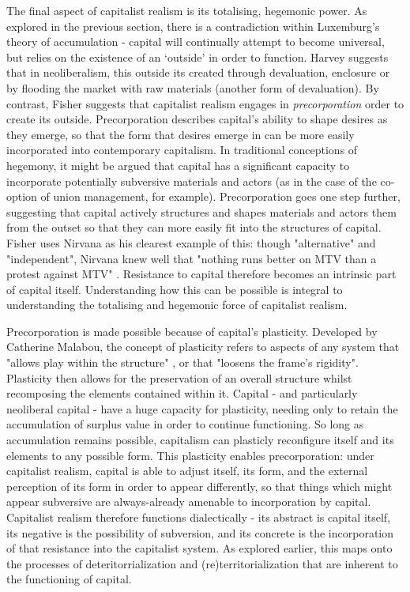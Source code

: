 The final aspect of capitalist realism is its totalising, hegemonic power. As explored in the previous section,  there is a contradiction within Luxemburg's theory of accumulation - capital will continually attempt to become universal, but relies on the existence of an `outside' in order to function. Harvey suggests that in neoliberalism, this outside its created through devaluation, enclosure or by flooding the market with raw materials (another form of devaluation). By contrast, Fisher suggests that capitalist realism engages in \emph{precorporation} order to create its outside. Precorporation describes capital's ability to shape desires as they emerge, so that the form that desires emerge in can be more easily incorporated into contemporary capitalism. In traditional conceptions of hegemony, it might be argued that capital has a significant capacity to incorporate potentially subversive materials and actors (as in the case of the co-option of union management, for example). Precorporation goes one step further, suggesting that capital actively structures and shapes materials and actors them from the outset so that they can more easily fit into the structures of capital. Fisher uses Nirvana as his clearest example of this: though "alternative" and "independent", Nirvana knew well that "nothing runs better on MTV than a protest against MTV" \citep[p. 13]{fisher_capitalist_2009}. Resistance to capital therefore becomes an intrinsic part of capital itself. Understanding how this can be possible is integral to understanding the totalising and hegemonic force of capitalist realism.

Precorporation is made possible because of capital's plasticity. Developed by Catherine Malabou, the concept of plasticity refers to aspects of any system that "allows play within the structure" \citep[p. 44]{malabou_will_2015}, or that "loosens the frame's rigidity". Plasticity then allows for the preservation of an overall structure whilst recomposing the elements contained within it. Capital - and particularly neoliberal capital - have a huge capacity for plasticity, needing only to retain the accumulation of surplus value in order to continue functioning. So long as accumulation remains possible, capitalism can plasticly reconfigure itself and its elements to any possible form. This plasticity enables precorporation:  under capitalist realism, capital is able to adjust itself, its form, and the external perception of its form in order to appear differently, so that things which might appear subversive are always-already amenable to incorporation by capital. Capitalist realism therefore functions dialectically - its abstract is capital itself, its negative is the possibility of subversion, and its concrete is the incorporation of that resistance into the capitalist system. As explored earlier, this maps onto the processes of deteritorrialization and (re)territorialization that are inherent to the functioning of capital.

